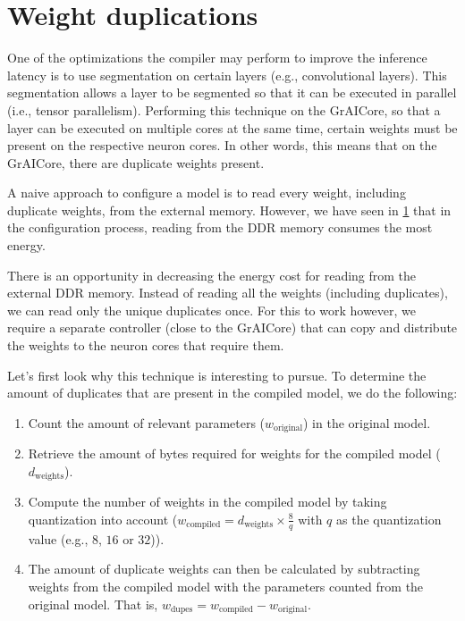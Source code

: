 \section{Weight duplications}
One of the optimizations the compiler may perform to improve the inference latency is to use segmentation on certain layers (e.g., convolutional layers).
This segmentation allows a layer to be segmented so that it can be executed in parallel (i.e., tensor parallelism).
Performing this technique on the GrAICore, so that a layer can be executed on multiple cores at the same time, certain weights must be present on the respective neuron cores.
In other words, this means that on the GrAICore, there are duplicate weights present.

A naive approach to configure a model is to read every weight, including duplicate weights, from the external memory.
However, we have seen in \ref{} that in the configuration process, reading from the DDR memory consumes the most energy.

There is an opportunity in decreasing the energy cost for reading from the external DDR memory.
Instead of reading all the weights (including duplicates), we can read only the unique duplicates once.
For this to work however, we require a separate controller (close to the GrAICore) that can copy and distribute the weights to the neuron cores that require them.

Let's first look why this technique is interesting to pursue.
To determine the amount of duplicates that are present in the compiled model, we do the following:
\begin{enumerate}
    \item
    Count the amount of relevant parameters ($w_
    \textrm{original}$) in the original model.
    \item
    Retrieve the amount of bytes required for weights for the compiled model ($d_\textrm{weights}$).
    \item
    Compute the number of weights in the compiled model by taking quantization into account ($w_\textrm{compiled} = d_\textrm{weights} \times \frac{8}{q}$ with $q$ as the quantization value (e.g., $8$, $16$ or $32$)).
    \item  
    The amount of duplicate weights can then be calculated by subtracting weights from the compiled model with the parameters counted from the original model. That is, $w_\textrm{dupes} = w_\textrm{compiled} - w_\textrm{original}$.
\end{enumerate}


